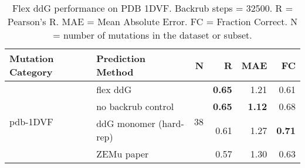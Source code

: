 \begin{table}
  \begin{tabular}{llrrrr}
\toprule
Mutation Category &       Prediction Method &   N &    R &  MAE &   FC \\
\midrule
 \multirow{ 4}{*}{pdb-1DVF} & flex ddG & \multirow{ 4}{*}{38} & \textbf{0.65} & 1.21 & 0.61  \\
 & no backrub control & & \textbf{0.65} & \textbf{1.12} & 0.68  \\
 & ddG monomer (hard-rep) & & 0.61 & 1.27 & \textbf{0.71}  \\
 & ZEMu paper & & 0.57 & 1.30 & 0.63  \\
\bottomrule
\end{tabular}
  \caption[Flex ddG performance on PDB 1DVF]{
    Flex ddG performance on PDB 1DVF. Backrub steps = 32500. R = Pearson's R. MAE = Mean Absolute Error. FC = Fraction Correct. N = number of mutations in the dataset or subset.
  } \label{tab:table-pdb-1DVF}
\end{table}
